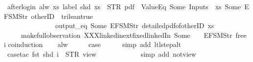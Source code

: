 \begin{isabellebody}
\endisatagproof
{\isafoldproof}%
%
\isadelimproof
\isanewline
%
\endisadelimproof
\isanewline
{}\isamarkupfalse%
\ after{\isacharunderscore}login{\isacharcolon}\ {\isachardoublequoteopen}alw\ {\isacharparenleft}{\isasymlambda}xs{\isachardot}\ label\ {\isacharparenleft}shd\ xs{\isacharparenright}\ {\isacharequal}\ STR\ {\isacharprime}{\isacharprime}pdf{\isacharprime}{\isacharprime}\ {\isasymand}\ ValueEq\ {\isacharparenleft}Some\ {\isacharparenleft}Inputs\ {}\ xs{\isacharparenright}{\isacharparenright}\ {\isacharparenleft}Some\ {\isacharparenleft}EFSM{\isachardot}Str\ {\isacharprime}{\isacharprime}otherID{\isacharprime}{\isacharprime}{\isacharparenright}{\isacharparenright}\ {\isacharequal}\ trilean{\isachardot}true\ {\isasymlongrightarrow}\isanewline
\ \ \ \ \ \ \ \ \ \ \ \ \ \ {\isasymnot}\ output_eq\ {\isacharbrackleft}Some\ {\isacharparenleft}EFSM{\isachardot}Str\ {\isacharprime}{\isacharprime}detailed{\isacharunderscore}pdf{\isacharunderscore}of{\isacharunderscore}otherID{\isacharprime}{\isacharprime}{\isacharparenright}{\isacharbrackright}\ xs{\isacharparenright}\isanewline
\ \ \ \ \ {\isacharparenleft}make{\isacharunderscore}full{\isacharunderscore}observation\ XXXlinkedin{\isacharunderscore}ext{\isacharunderscore}fixed{\isachardot}linkedIn\ {\isacharparenleft}Some\ {}{\isacharparenright}\ {\isacharparenleft}{\isacharless}{\isachargreater}{\isacharparenleft}{}\ {\isacharcolon}{\isacharequal}\ EFSM{\isachardot}Str\ {\isacharprime}{\isacharprime}free{\isacharprime}{\isacharprime}{\isacharparenright}{\isacharparenright}\ i{\isacharparenright}{\isachardoublequoteclose}\isanewline
%
\isadelimproof
%
\endisadelimproof
%
\isatagproof
{}\isamarkupfalse%
{\isacharparenleft}coinduction{\isacharparenright}\isanewline
\ \ \isamarkupfalse%
\ alw\isanewline
\ \ \isamarkupfalse%
\ \isamarkupfalse%
\ {\isacharquery}case\isanewline
\ \ \ \ \isamarkupfalse%
\ {\isacharparenleft}simp\ add{\isacharcolon}\ ltl{\isacharunderscore}step{\isacharunderscore}alt{\isacharparenright}\isanewline
\ \ \ \ \isamarkupfalse%
\ {\isacharparenleft}case{\isacharunderscore}tac\ {\isachardoublequoteopen}{\isacharparenleft}fst\ {\isacharparenleft}shd\ i{\isacharparenright}{\isacharparenright}\ {\isacharequal}\ STR\ {\isacharprime}{\isacharprime}view{\isacharprime}{\isacharprime}{\isachardoublequoteclose}{\isacharparenright}\isanewline
\ \ \ \ \ \isamarkupfalse%
\isanewline
\ \ \ \ \ \isamarkupfalse%
\ {\isacharparenleft}simp\ add{\isacharcolon}\ not{\isacharunderscore}view{\isacharunderscore}{}{\isacharparenright}\isanewline

\end{isabellebody}
